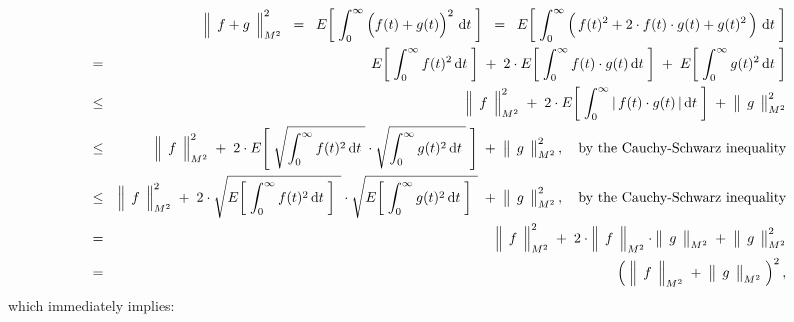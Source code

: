 \begin{eqnarray*}
&&
	\left\Vert\;\, \overset{{\color{white}.}}{f} + \overset{{\color{white}.}}{g} \,\;\right\Vert_{M^{2}}^{2}
\;\; = \;\;
	E\!\left[\; \int_{0}^{\infty} \left(f(t) \overset{{\color{white}.}}{+} g(t)\right)^{2} \,\d t \;\right]
\;\; = \;\;
	E\!\left[\; \int_{0}^{\infty}
		\left(\,f(t)^{2}
		\overset{{\color{white}.}}{+}
		2 \cdot f(t) \cdot g(t)
		\overset{{\color{white}.}}{+}
		g(t)^{2}\,\right)
		\,\d t \;\right]
\\
& = &
	E\!\left[\; \int_{0}^{\infty} f(t)^{2} \,\d t \;\right]
	\; + \;
	2 \cdot
	E\!\left[\; \int_{0}^{\infty}
		f(t) \cdot g(t)
		\,\d t \;\right]
	\; + \;
	E\!\left[\; \int_{0}^{\infty} g(t)^{2} \,\d t \;\right]
\\
& \leq &
	\left\Vert\;\, \overset{{\color{white}.}}{f} \,\;\right\Vert_{M^{2}}^{2}
	\; + \;
	2 \cdot
	E\!\left[\; \int_{0}^{\infty}
		\vert\,f(t) \cdot g(t)\,\vert
		\,\d t \;\right]
	\; + \;
	\left\Vert\;\, \overset{{\color{white}.}}{g} \,\;\right\Vert_{M^{2}}^{2}
\\
& \leq &
	\left\Vert\;\, \overset{{\color{white}.}}{f} \,\;\right\Vert_{M^{2}}^{2}
	\; + \;
	2 \cdot
	E\!\left[\;
		\sqrt{\int_{0}^{\infty} f(t)^{2} \,\d t{\color{white}.}}
		\cdot
		\sqrt{\int_{0}^{\infty} g(t)^{2} \,\d t{\color{white}.}}
		\;\right]
	\; + \;
	\left\Vert\;\, \overset{{\color{white}.}}{g} \,\;\right\Vert_{M^{2}}^{2},
	\quad
	\textnormal{by the Cauchy-Schwarz inequality}
\\
& \leq &
	\left\Vert\;\, \overset{{\color{white}.}}{f} \,\;\right\Vert_{M^{2}}^{2}
	\; + \;
	2 \cdot
	\sqrt{E\!\left[\;
		\int_{0}^{\infty} f(t)^{2} \,\d t
		\;\right]{\color{white}.}}
	\cdot
	\sqrt{E\!\left[\;
		\int_{0}^{\infty} g(t)^{2} \,\d t
		\;\right]{\color{white}.}}
	\; + \;
	\left\Vert\;\, \overset{{\color{white}.}}{g} \,\;\right\Vert_{M^{2}}^{2},
	\quad
	\textnormal{by the Cauchy-Schwarz inequality}
\\
& = &
	\left\Vert\;\, \overset{{\color{white}.}}{f} \,\;\right\Vert_{M^{2}}^{2}
	\; + \;
	2 \cdot
		\left\Vert\;\, \overset{{\color{white}.}}{f} \,\;\right\Vert_{M^{2}}
		\cdot
		\left\Vert\;\, \overset{{\color{white}.}}{g} \,\;\right\Vert_{M^{2}}
	\; + \;
	\left\Vert\;\, \overset{{\color{white}.}}{g} \,\;\right\Vert_{M^{2}}^{2}
\\
& = &
	\left(\;
		\left\Vert\;\, \overset{{\color{white}.}}{f} \,\;\right\Vert_{M^{2}}
		\; + \;
		\left\Vert\;\, \overset{{\color{white}.}}{g} \,\;\right\Vert_{M^{2}}
		\;\right)^{2},
\end{eqnarray*}
which immediately implies:
